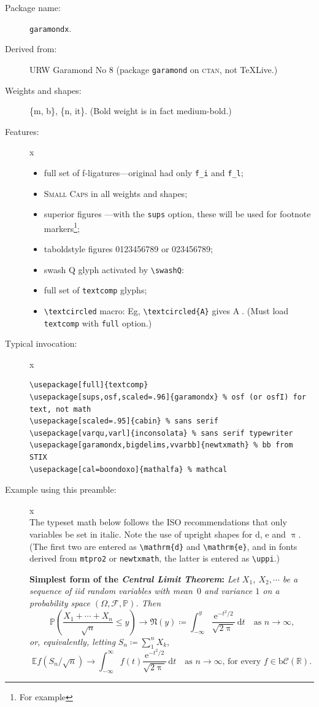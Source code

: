 \documentclass{article}
\begin{document}
\begin{description}
\item[Package name:] {\tt garamondx}.
\item[Derived from:] URW Garamond No 8 (package {\tt garamond} on \textsc{ctan}, not \TeX Live.)
\item[Weights and shapes:]  \{m, b\}, \{n, it\}. (Bold weight is in fact medium-bold.)
\item[Features:]{\color{white}x}\\[-16pt]  
\begin{itemize}
\item
full set of f-ligatures---original had only \verb|f_i| and \verb|f_l|;
\item \textsc{Small Caps} in all weights and shapes;
\item superior figures ---with the {\tt sups} option, these will be used for footnote markers\footnote{For example};
\item taboldstyle figures 0123456789 or 023456789;
\item swash Q glyph  activated by \verb|\swashQ|:  \swashQ
\item full set of {\tt textcomp} glyphs; 
\item \verb|\textcircled| macro: Eg, \verb|\textcircled{A}| gives \textcircled{A}. (Must load {\tt textcomp} with {\tt full} option.)
\end{itemize}
\item[Typical invocation:]{\color{white}x}
\begin{verbatim}
\usepackage[full]{textcomp}
\usepackage[sups,osf,scaled=.96]{garamondx} % osf (or osfI) for text, not math
\usepackage[scaled=.95]{cabin} % sans serif
\usepackage[varqu,varl]{inconsolata} % sans serif typewriter
\usepackage[garamondx,bigdelims,vvarbb]{newtxmath} % bb from STIX
\usepackage[cal=boondoxo]{mathalfa} % mathcal
\end{verbatim}
\item[Example using this preamble:]{\color{white}x}\\[6pt]
\lipsum[1]
\def\Pr{\ensuremath{\mathbb{P}}}
\def\d{\mathrm{d}}
The typeset math below follows the ISO recommendations that only variables
be set in italic. Note the use of upright shapes for $\d$, $\mathrm{e}$
and $\uppi$. (The first two are entered as \verb|\mathrm{d}| and
\verb|\mathrm{e}|, and in fonts derived from {\tt mtpro2} or {\tt newtxmath},
 the latter is entered as \verb|\uppi|.)

\textbf{Simplest form of the \textit{Central Limit Theorem}:} \textit{Let
$X_1$, $X_2,\cdots$ be a sequence of iid random variables with mean~$0$ 
and variance $1$ on a probability space $(\Omega,\mathcal{F},\Pr)$. Then}
\[\Pr\left(\frac{X_1+\cdots+X_n}{\sqrt{n}}\le y\right)\to\mathfrak{N}(y)\coloneq
\int_{-\infty}^y \frac{\mathrm{e}^{-t^2/2}}{\sqrt{2\uppi}}\,
\mathrm{d}t\quad\mbox{as $n\to\infty$,}\]
\textit{or, equivalently, letting} $S_n\coloneq\sum_1^n X_k$,
\[\mathbb{E} f\left(S_n/\sqrt{n}\right)\to \int_{-\infty}^\infty f(t)
\frac{\mathrm{e}^{-t^2/2}}{\sqrt{2\uppi}}\,\mathrm{d}t
\quad\mbox{as $n\to\infty$, for every $f\in\mathrm{b}
\mathcal{C}(\mathbb{R})$.}\]
\end{description}
\end{document}
